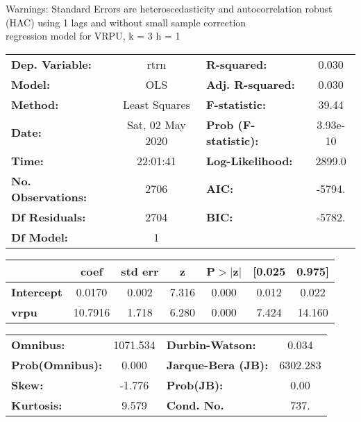 Warnings: \newline
 [1] Standard Errors are heteroscedasticity and autocorrelation robust (HAC) using 1 lags and without small sample correction\\ 

regression model for VRPU, k = 3 h = 1\begin{center}
\begin{tabular}{lclc}
\toprule
\textbf{Dep. Variable:}    &       rtrn       & \textbf{  R-squared:         } &     0.030   \\
\textbf{Model:}            &       OLS        & \textbf{  Adj. R-squared:    } &     0.030   \\
\textbf{Method:}           &  Least Squares   & \textbf{  F-statistic:       } &     39.44   \\
\textbf{Date:}             & Sat, 02 May 2020 & \textbf{  Prob (F-statistic):} &  3.93e-10   \\
\textbf{Time:}             &     22:01:41     & \textbf{  Log-Likelihood:    } &    2899.0   \\
\textbf{No. Observations:} &        2706      & \textbf{  AIC:               } &    -5794.   \\
\textbf{Df Residuals:}     &        2704      & \textbf{  BIC:               } &    -5782.   \\
\textbf{Df Model:}         &           1      & \textbf{                     } &             \\
\bottomrule
\end{tabular}
\begin{tabular}{lcccccc}
                   & \textbf{coef} & \textbf{std err} & \textbf{z} & \textbf{P$> |$z$|$} & \textbf{[0.025} & \textbf{0.975]}  \\
\midrule
\textbf{Intercept} &       0.0170  &        0.002     &     7.316  &         0.000        &        0.012    &        0.022     \\
\textbf{vrpu}      &      10.7916  &        1.718     &     6.280  &         0.000        &        7.424    &       14.160     \\
\bottomrule
\end{tabular}
\begin{tabular}{lclc}
\textbf{Omnibus:}       & 1071.534 & \textbf{  Durbin-Watson:     } &    0.034  \\
\textbf{Prob(Omnibus):} &   0.000  & \textbf{  Jarque-Bera (JB):  } & 6302.283  \\
\textbf{Skew:}          &  -1.776  & \textbf{  Prob(JB):          } &     0.00  \\
\textbf{Kurtosis:}      &   9.579  & \textbf{  Cond. No.          } &     737.  \\
\bottomrule
\end{tabular}
\end{center}

